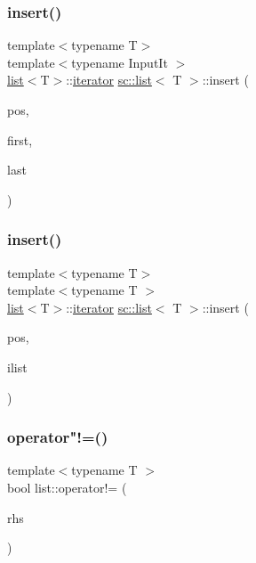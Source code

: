 \subsubsection{\texorpdfstring{insert()}{insert()}\hspace{0.1cm}{\footnotesize\ttfamily [6/7]}}
{\footnotesize\ttfamily template$<$typename T$>$ \\
template$<$typename Input\+It $>$ \\
\mbox{\hyperlink{classsc_1_1list}{list}}$<$T$>$\+::\mbox{\hyperlink{classsc_1_1list_1_1iterator}{iterator}} \mbox{\hyperlink{classsc_1_1list}{sc\+::list}}$<$ T $>$\+::insert (\begin{DoxyParamCaption}\item[{\mbox{\hyperlink{classsc_1_1list_1_1iterator}{iterator}}}]{pos,  }\item[{Input\+It}]{first,  }\item[{Input\+It}]{last }\end{DoxyParamCaption})}

\mbox{\label{classsc_1_1list_a08e432de3c38c6e770e9c6de2f0782e2}} 
\subsubsection{\texorpdfstring{insert()}{insert()}\hspace{0.1cm}{\footnotesize\ttfamily [7/7]}}
{\footnotesize\ttfamily template$<$typename T$>$ \\
template$<$typename T $>$ \\
\mbox{\hyperlink{classsc_1_1list}{list}}$<$T$>$\+::\mbox{\hyperlink{classsc_1_1list_1_1iterator}{iterator}} \mbox{\hyperlink{classsc_1_1list}{sc\+::list}}$<$ T $>$\+::insert (\begin{DoxyParamCaption}\item[{\mbox{\hyperlink{classsc_1_1list_1_1iterator}{iterator}}}]{pos,  }\item[{std\+::initializer\+\_\+list$<$ T $>$}]{ilist }\end{DoxyParamCaption})}

\mbox{\label{classsc_1_1list_add9f9d9fb6302969e9ac7822e46ff222}} 
\subsubsection{\texorpdfstring{operator"!=()}{operator!=()}}
{\footnotesize\ttfamily template$<$typename T $>$ \\
bool list\+::operator!= (\begin{DoxyParamCaption}\item[{const \mbox{\hyperlink{classsc_1_1list}{list}}$<$ T $>$ \&}]{rhs }\end{DoxyParamCaption})}

